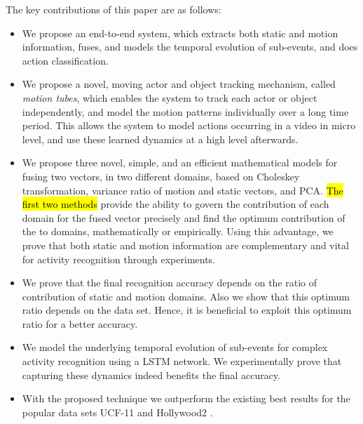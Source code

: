 The key contributions of this paper are as follows:

 \begin{itemize}
  \item We propose an end-to-end system, which  extracts both static and motion information, fuses, and models the
temporal evolution of sub-events, and does action classification.
  \item We propose a novel, moving actor and object tracking mechanism, called \textit{motion tubes},
which enables the system to track each actor or object independently, and model the motion patterns individually over a long time period.
This allows the system to model actions occurring in a video in micro level, and use these learned dynamics
at a high level afterwards.
 \item We propose three novel, simple, and an efficient mathematical models for fusing two vectors,
in two different domains, based on Choleskey transformation, variance ratio of motion and static vectors, and PCA. \hl{The first two methods} provide
the ability to govern the contribution of each domain for the fused vector precisely and find the optimum contribution of the to domains, mathematically or empirically. Using this advantage, we prove that both static and motion information are complementary and vital for activity recognition through experiments.
 \item We prove that the final recognition accuracy depends on the ratio of contribution of static and motion domains. Also we show that
 this optimum ratio depends on the data set. Hence, it is beneficial to exploit this optimum ratio for a better accuracy.
  \item We model the underlying temporal evolution of sub-events for complex activity recognition using a LSTM network. We experimentally
prove that capturing these dynamics indeed benefits the final accuracy.

\item With the proposed technique
we outperform the existing best results for the popular data sets UCF-11 \cite{liu2009recognizing}
and Hollywood2 \cite{marszalek2009actions}.
 \end{itemize}




